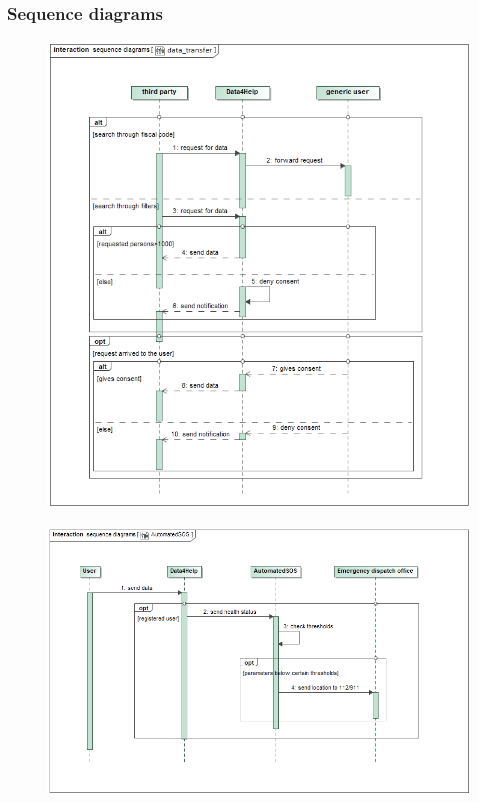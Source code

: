 \subsubsection{Sequence diagrams}
\begin{figure}[h!]
\centering
\includegraphics[scale=0.57]{sections/diagrams/data_transfer.png} \newline
{}
\end{figure}

\begin{figure}[h!] \ContinuedFloat
\centering
\includegraphics[scale=0.57]{sections/diagrams/AutomatedSOS.png} \newline
{}
\end{figure}

